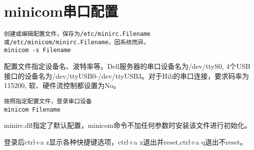 \section{minicom串口配置}

\begin{verbatim}
创建或编辑配置文件，保存为/etc/minirc.Filename或/etc/minicom/minirc.Filename，因系统而异。
minicom -s Filename
\end{verbatim}
配置文件指定设备名、波特率等。Dell服务器的串口设备名为/dev/ttyS0, 4个USB接口的设备名为/dev/ttyUSB0-/dev/ttyUSB3。对于Hili的串口连接，要求码率为115200, 软、硬件流控制都设置为No。



\begin{verbatim}
按照指定配置文件，登录串口设备
minicom Filename
\end{verbatim}


minirc.dfl指定了默认配置，minicom命令不加任何参数时安装该文件进行初始化。

登录后ctrl+a z显示各种快捷键选项，ctrl+a x退出并reset,ctrl+a q退出不reset。


